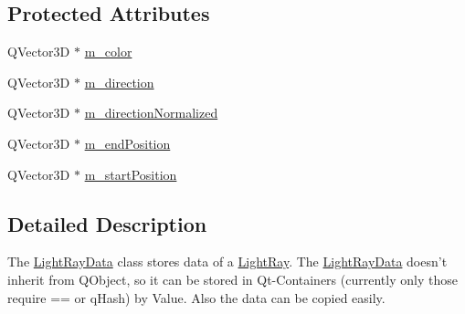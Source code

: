 \subsection*{Protected Attributes}
\begin{DoxyCompactItemize}
\item 
Q\+Vector3\+D $\ast$ \hyperlink{class_light_ray_data_ae6ad9fa7cd9bc9db1837691c603e5eaa}{m\+\_\+color}
\item 
Q\+Vector3\+D $\ast$ \hyperlink{class_light_ray_data_a4a71e8787288d9e243c3c9dd744350ff}{m\+\_\+direction}
\item 
Q\+Vector3\+D $\ast$ \hyperlink{class_light_ray_data_af18cf984ba862735dcde2d77767c4bb2}{m\+\_\+direction\+Normalized}
\item 
Q\+Vector3\+D $\ast$ \hyperlink{class_light_ray_data_ab7228a576b4b1c0843641e3706a6cb35}{m\+\_\+end\+Position}
\item 
Q\+Vector3\+D $\ast$ \hyperlink{class_light_ray_data_a1da577bdf12b630015fca5d89712e479}{m\+\_\+start\+Position}
\end{DoxyCompactItemize}


\subsection{Detailed Description}
The \hyperlink{class_light_ray_data}{Light\+Ray\+Data} class stores data of a \hyperlink{class_light_ray}{Light\+Ray}. The \hyperlink{class_light_ray_data}{Light\+Ray\+Data} doesn't inherit from Q\+Object, so it can be stored in Qt-\/\+Containers (currently only those require == or q\+Hash) by Value. Also the data can be copied easily. 

